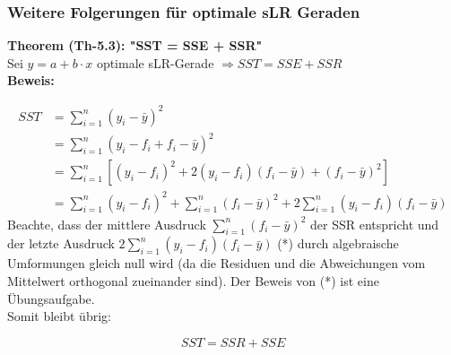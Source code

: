 \documentclass[12pt]{article}
\begin{document}
\subsubsection{Weitere Folgerungen für optimale sLR Geraden}  


\textbf{Theorem (Th-5.3): "SST = SSE + SSR"} \\[0.2cm]
Sei $ y = a + b \cdot x $ optimale sLR-Gerade $ \Longrightarrow SST = SSE + SSR $
\\[0.2cm]
\textbf{Beweis:} 

\begin{align*}
SST &= \sum_{i=1}^{n} (y_i - \bar{y})^2 \\
&= \sum_{i=1}^{n} (y_i - f_i + f_i - \bar{y})^2 \\
&= \sum_{i=1}^{n} [(y_i - f_i)^2 + 2(y_i - f_i)(f_i - \bar{y}) + (f_i - \bar{y})^2] \\
&= \sum_{i=1}^{n} (y_i - f_i)^2 + \sum_{i=1}^{n} (f_i - \bar{y})^2 + 2\sum_{i=1}^{n} (y_i - f_i)(f_i - \bar{y})
\end{align*}
%
Beachte, dass der mittlere Ausdruck $\sum_{i=1}^{n} (f_i - \bar{y})^2$ der SSR entspricht und der letzte Ausdruck $2\sum_{i=1}^{n} (y_i - f_i)(f_i - \bar{y})$ (*) durch algebraische Umformungen gleich null wird (da die Residuen und die Abweichungen vom Mittelwert orthogonal zueinander sind).
Der Beweis von (*) ist eine Übungsaufgabe.\\[0.4cm]
 
Somit bleibt übrig:

\[
SST = SSR + SSE
\]
\end{document}
